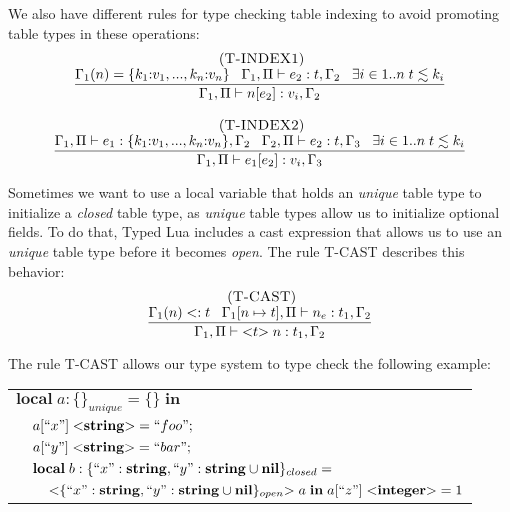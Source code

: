We also have different rules for type checking table indexing to avoid
promoting table types in these operations:
\[
\begin{array}{c}
\begin{array}{c}
\; (\textsc{T-INDEX1})\\
\dfrac{\Gamma_{1}(n) = \{k_{1}{:}v_{1}, ..., k_{n}{:}v_{n}\} \;\;\;
       \Gamma_{1}, \Pi \vdash e_{2}:t, \Gamma_{2} \;\;\;
       \exists i \in 1{..}n \; t \lesssim k_{i}}
      {\Gamma_{1}, \Pi \vdash n[e_{2}]:v_{i}, \Gamma_{2}}
\end{array}
\\ \\
\begin{array}{c}
\; (\textsc{T-INDEX2})\\
\dfrac{\Gamma_{1}, \Pi \vdash e_{1}:\{k_{1}{:}v_{1}, ..., k_{n}{:}v_{n}\}, \Gamma_{2} \;\;\;
       \Gamma_{2}, \Pi \vdash e_{2}:t, \Gamma_{3} \;\;\;
       \exists i \in 1{..}n \; t \lesssim k_{i}}
      {\Gamma_{1}, \Pi \vdash e_{1}[e_{2}]:v_{i}, \Gamma_{3}}
\end{array}
\end{array}
\]

Sometimes we want to use a local variable that holds an \emph{unique}
table type to initialize a \emph{closed} table type, as \emph{unique}
table types allow us to initialize optional fields.
To do that, Typed Lua includes a cast expression that allows us
to use an \emph{unique} table type before it becomes \emph{open}.
The rule \textsc{T-CAST} describes this behavior:
\[
\begin{array}{c}
\; (\textsc{T-CAST})\\
\dfrac{\Gamma_{1}(n) <: t \;\;\;
       \Gamma_{1}[n \mapsto t], \Pi \vdash n_{e}:t_{1}, \Gamma_{2}}
      {\Gamma_{1}, \Pi \vdash {<}t{>} \; n:t_{1}, \Gamma_{2}}
\end{array}
\]

The rule \textsc{T-CAST} allows our type system to type check the following example:
\begin{center}
\begin{tabular}{lll}
\multicolumn{3}{l}{$\mathbf{local} \; a:\{\}_{unique} = \{ \} \; \mathbf{in}$}\\
& \multicolumn{2}{l}{$a[``x"] \; {<}\mathbf{string}{>} = ``foo";$}\\
& \multicolumn{2}{l}{$a[``y"] \; {<}\mathbf{string}{>} = ``bar";$}\\
& \multicolumn{2}{l}{$\mathbf{local} \; b:\{``x":\mathbf{string}, ``y":\mathbf{string} \cup \mathbf{nil} \}_{closed} =$}\\
& & \multicolumn{1}{l}{${<}\{``x":\mathbf{string}, ``y":\mathbf{string} \cup \mathbf{nil}\}_{open}{>} \; a \; \mathbf{in} \; a[``z"] \; {<}\mathbf{integer}{>} = 1$}
\end{tabular}
\end{center}


